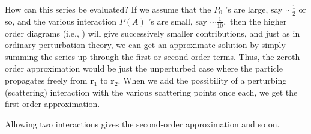 How can this series be evaluated? If we assume that the $P_{0}$ 's are large, say $\sim \frac{1}{2}$ or so, and the various interaction $P(A)$ 's are small, say $\sim \frac{1}{10},$ then the higher order diagrams (i.e., ) will give successively smaller contributions, and just as in ordinary perturbation theory, we can get an approximate solution by simply summing the series up through the first-or second-order terms. Thus, the zeroth-order approximation would be just the unperturbed case where the particle propagates freely from $\mathbf{r}_{1}$ to $\mathbf{r}_{2} .$ When we add the possibility of a perturbing (scattering) interaction with the various scattering points once each, we get the first-order approximation.

Allowing two interactions gives the second-order approximation and so on. 

